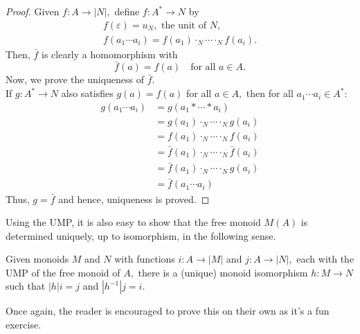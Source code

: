 \begin{proof} 
	Given $f:A \to |N|,$ define $f:A^* \to N$ by
	\begin{align*} 
		f(\varepsilon) = u_N, \text{ the unit of }N,\\
		f(a_1\cdots a_i) = f(a_1)\cdot_N\cdots\cdot_Nf(a_i).
	\end{align*}
	Then, $\bar{f}$ is clearly a homomorphism with 
	\begin{equation*} 
		\bar{f}(a) = f(a) \quad \text{for all } a \in A.
	\end{equation*}
	Now, we prove the uniqueness of $\bar{f}.$\\
	If $g:A^* \to N$ also satisfies $g(a) = f(a)$ for all $a \in A,$ then for all $a_1\cdots a_i \in A^*:$
	\begin{align*} 
		g(a_1\cdots a_i) &= g(a_1*\cdots *a_i)\\
		&= g(a_1)\cdot_N\cdots\cdot_Ng(a_i)\\
		&= f(a_1)\cdot_N\cdots\cdot_Nf(a_i)\\
		&= \bar{f}(a_1)\cdot_N\cdots\cdot_N\bar{f}(a_i)\\
		&= \bar{f}(a_1)\cdot_N\cdots\cdot_Ng(a_i)\\
		&= \bar{f}(a_1\cdots a_i)
	\end{align*}
	Thus, $g = \bar{f}$ and hence, uniqueness is proved.
\end{proof}
Using the UMP, it is also easy to show that the free monoid $M(A)$ is determined uniquely, up to isomorphism, in the following sense.
\begin{prop}
	Given monoids $M$ and $N$ with functions $i:A\to |M|$ and $j:A\to|N|,$ each with the UMP of the free monoid of $A,$ there is a (unique) monoid isomorphism $h:M\to N$ such that $|h|i = j$ and $|h^{-1}|j = i.$
\end{prop}
Once again, the reader is encouraged to prove this on their own as it's a fun exercise.
